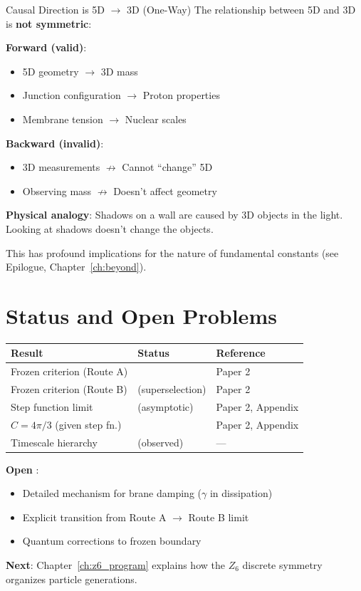 \begin{warningbox}{Causal Direction is 5D $\to$ 3D (One-Way)}
The relationship between 5D and 3D is \textbf{not symmetric}:

\textbf{Forward (valid)}:
\begin{itemize}[nosep]
\item 5D geometry $\to$ 3D mass
\item Junction configuration $\to$ Proton properties
\item Membrane tension $\to$ Nuclear scales
\end{itemize}

\textbf{Backward (invalid)}:
\begin{itemize}[nosep]
\item 3D measurements $\not\to$ Cannot ``change'' 5D
\item Observing mass $\not\to$ Doesn't affect geometry
\end{itemize}

\textbf{Physical analogy}: Shadows on a wall are caused by 3D objects
in the light. Looking at shadows doesn't change the objects.
\end{warningbox}

This has profound implications for the nature of fundamental constants
(see Epilogue, Chapter~\ref{ch:beyond}).

\section{Status and Open Problems}
\label{sec:frozen_status}

\begin{center}
\begin{tabular}{lll}
\toprule
\textbf{Result} & \textbf{Status} & \textbf{Reference} \\
\midrule
Frozen criterion (Route A) & \tagDc{} & Paper 2 \\
Frozen criterion (Route B) & \tagP{} (superselection) & Paper 2 \\
Step function limit & \tagDcApprox{} (asymptotic) & Paper 2, Appendix \\
$C = 4\pi/3$ (given step fn.) & \tagDerSym{} & Paper 2, Appendix \\
Timescale hierarchy & \tagI{} (observed) & --- \\
\bottomrule
\end{tabular}
\end{center}

\textbf{Open} \tagOpen{}:
\begin{itemize}[nosep]
\item Detailed mechanism for brane damping ($\gamma$ in dissipation)
\item Explicit transition from Route A $\to$ Route B limit
\item Quantum corrections to frozen boundary
\end{itemize}

\bigskip

\noindent\textbf{Next}: Chapter~\ref{ch:z6_program} explains how the
$Z_6$ discrete symmetry organizes particle generations.
